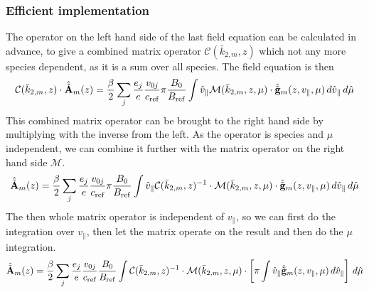 \subsubsection{Efficient implementation}
The operator on the left hand side of the last field equation can be
calculated in advance, to give a combined matrix operator
$\mathcal{C}(\bar{k}_{2,m},z)$ which not any more species dependent,
as it is a sum over all species. The field equation is then
\begin{displaymath}
  \mathcal{C}(\bar{k}_{2,m},z) \cdot\hat{\tilde{\mathbf{A}}}_m(z)
  = \frac{\beta}{2}\sum_j \frac{e_j}{e} \frac{v_{0j}}{c_{\mathrm{ref}}}\pi\frac{B_0}{B_\mathrm{ref}}\int \hat{v}_\| 
  \mathcal{M}(\bar{k}_{2,m},z,\mu)\cdot\hat{\tilde{\mathbf{g}}}_m(z,v_\|,\mu)\,d\hat{v}_\|\,d\hat{\mu}
\end{displaymath}
This combined matrix operator can be brought to the right hand side by
multiplying with the inverse from the left. As the operator is species
and $\mu$ independent, we can combine it further with the matrix
operator on the right hand side $\mathcal{M}$. 
\begin{displaymath}
  \hat{\tilde{\mathbf{A}}}_m(z)
  = \frac{\beta}{2}\sum_j \frac{e_j}{e} \frac{v_{0j}}{c_{\mathrm{ref}}}\pi\frac{B_0}{B_\mathrm{ref}}\int \hat{v}_\| 
  \mathcal{C}(\bar{k}_{2,m},z)^{-1}\cdot\mathcal{M}(\bar{k}_{2,m},z,\mu)\cdot\hat{\tilde{\mathbf{g}}}_m(z,v_\|,\mu)\,d\hat{v}_\|\,d\hat{\mu}
\end{displaymath}
The then whole matrix operator is independent of $v_\|$, so we can
first do the integration over $v_\|$, then let the matrix operate on
the result and then do the $\mu$ integration.
\begin{displaymath}
  \hat{\tilde{\mathbf{A}}}_m(z)
  = \frac{\beta}{2}\sum_j \frac{e_j}{e} \frac{v_{0j}}{c_{\mathrm{ref}}}\frac{B_0}{B_\mathrm{ref}}\int
  \mathcal{C}(\bar{k}_{2,m},z)^{-1}\cdot\mathcal{M}(\bar{k}_{2,m},z,\mu)\cdot\left[
    \pi\int\hat{v}_\|\hat{\tilde{\mathbf{g}}}_m(z,v_\|,\mu)\,d\hat{v}_\|\right]\,d\hat{\mu}
\end{displaymath}


